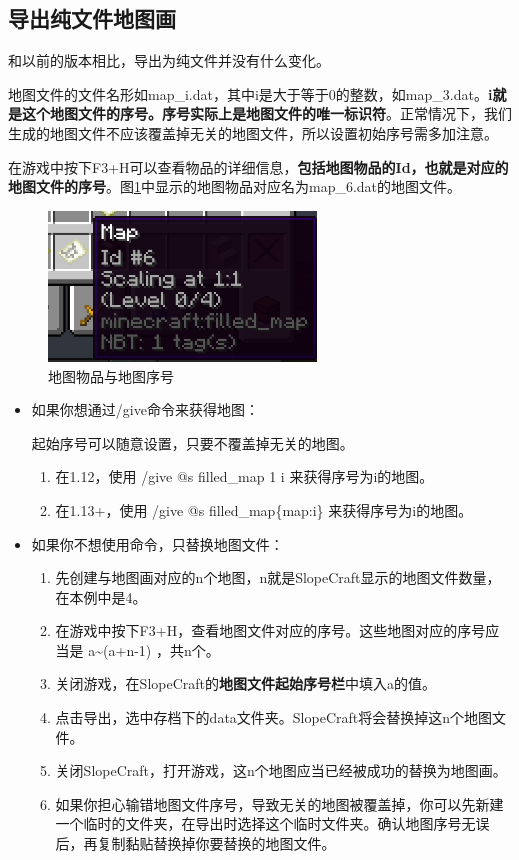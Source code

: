 \documentclass[UTF8]{ctexart}
\begin{document}
    \subsection{导出纯文件地图画}
    和以前的版本相比，导出为纯文件并没有什么变化。

    地图文件的文件名形如map\_i.dat，其中i是大于等于0的整数，如map\_3.dat。\textbf{i就是这个地图文件的序号。序号实际上是地图文件的唯一标识符}。正常情况下，我们生成的地图文件不应该覆盖掉无关的地图文件，所以设置初始序号需多加注意。

   在游戏中按下F3+H可以查看物品的详细信息，\textbf{包括地图物品的Id，也就是对应的地图文件的序号}。图\ref*{mapItem}中显示的地图物品对应名为map\_6.dat的地图文件。
   \begin{figure}[htbp]
       \centering
       \includegraphics[height=4cm]{Img8_MapItem.png}
       \caption{地图物品与地图序号}
       \label{mapItem}
   \end{figure}

   \begin{itemize}
       \item 如果你想通过/give命令来获得地图：
       
       起始序号可以随意设置，只要不覆盖掉无关的地图。
       \begin{enumerate}
           \item 在1.12，使用 /give @s filled\_map 1 i 来获得序号为i的地图。
           \item 在1.13+，使用 /give @s filled\_map\{map:i\} 来获得序号为i的地图。
       \end{enumerate}
       \item 如果你不想使用命令，只替换地图文件：
       \begin{enumerate}
           \item 先创建与地图画对应的n个地图，n就是SlopeCraft显示的地图文件数量，在本例中是4。
           \item 在游戏中按下F3+H，查看地图文件对应的序号。这些地图对应的序号应当是 a\textasciitilde(a+n-1) ，共n个。
           \item 关闭游戏，在SlopeCraft的\textbf{地图文件起始序号栏}中填入a的值。
           \item 点击导出，选中存档下的data文件夹。SlopeCraft将会替换掉这n个地图文件。
           \item 关闭SlopeCraft，打开游戏，这n个地图应当已经被成功的替换为地图画。
           \item 如果你担心输错地图文件序号，导致无关的地图被覆盖掉，你可以先新建一个临时的文件夹，在导出时选择这个临时文件夹。确认地图序号无误后，再复制黏贴替换掉你要替换的地图文件。
       \end{enumerate}
   \end{itemize}
   
\end{document}
